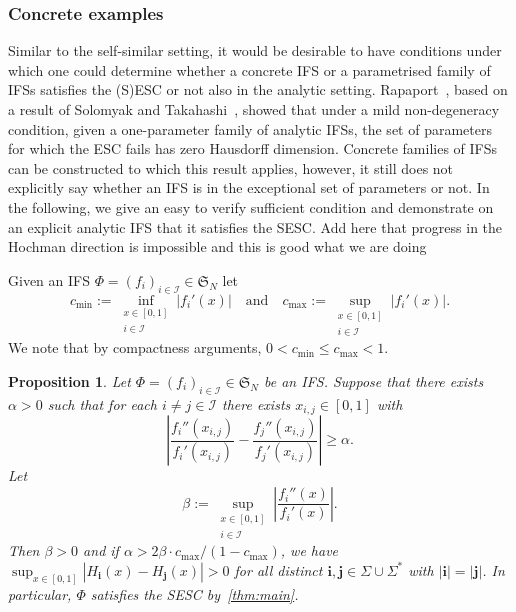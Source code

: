 \documentclass[11pt,]{article}
\def\cref#1{\ref{#1}}%
\newtheorem{proposition}[theorem]{Proposition}
\theoremstyle{definition}
\theoremstyle{remark}
\newcommand{\0}{\mathbf{0}}
\newcommand{\bi}{\mathbf{i}}
\newcommand{\bj}{\mathbf{j}}
\begin{document}
\subsubsection{Concrete examples}\label{sec:examples}
Similar to the self-similar setting, it would be desirable to have conditions under which one
could determine whether a concrete IFS or a parametrised family of IFSs satisfies the (S)ESC or not
also in the analytic setting. Rapaport~\cite[Corollary 1.4]{Rapaport_SelfConfESC25arXiv}, based on a
result of Solomyak and Takahashi~\cite{SolomyakTakahashi_IMRN21}, showed that under a mild
non-degeneracy condition, given a one-parameter family of analytic IFSs, the set of parameters for
which the ESC fails has zero Hausdorff dimension. Concrete families of IFSs can be constructed to
which this result applies, however, it still does not explicitly say whether an IFS is in the
exceptional set of parameters or not. 
In the following, we give an easy to verify sufficient condition and demonstrate on
an explicit analytic IFS that it satisfies the SESC. 
{\color{red}Add here that progress in the Hochman direction is impossible and this is good what we
are doing}

Given an IFS $\Phi=(f_i)_{i\in\mathcal{I}}\in\mathfrak{S}_N$ let
\begin{equation}\label{eq:maxmincontract}
  c_{\min} := \inf_{\substack{x\in[0,1] \\ i\in\mathcal{I}}} |f_i'(x)| \quad\text{and}\quad
  c_{\max}:=\sup_{\substack{x\in[0,1] \\ i\in\mathcal{I}}} |f_i'(x)|.
\end{equation}
We note that by compactness arguments, $0<c_{\min} \leq c_{\max} <1$.

\begin{proposition}\label{prop:example}
Let $\Phi=(f_i)_{i\in\mathcal{I}}\in\mathfrak{S}_N$ be an IFS. Suppose that there exists $\alpha>0$
such that for each $i\neq j\in\mathcal{I}$ there exists $x_{i,j}\in[0,1]$ with
\begin{equation*}
\left| \frac{f_i''(x_{i,j})}{f_i'(x_{i,j})} - \frac{f_j''(x_{i,j})}{f_j'(x_{i,j})} \right| \geq \alpha . 
\end{equation*}
Let
\begin{equation*}
  \beta:=\sup_{\substack{x\in[0,1] \\ i\in\mathcal{I}}} \left| \frac{f_i''(x)}{f_i'(x)} \right|.
\end{equation*}
Then $\beta>0$ and if $\alpha > 2\beta\cdot c_{\max}/(1-c_{\max})$, we have
$
\sup_{x\in[0,1]} |H_{\bi}(x) - H_{\bj}(x)| > 0 
$
for all distinct $\bi,\bj \in\Sigma\cup\Sigma^*$ with $|\bi|=|\bj|$. In particular, $\Phi$ satisfies
the SESC by~\cref{thm:main}.
\end{proposition}
\end{document}
